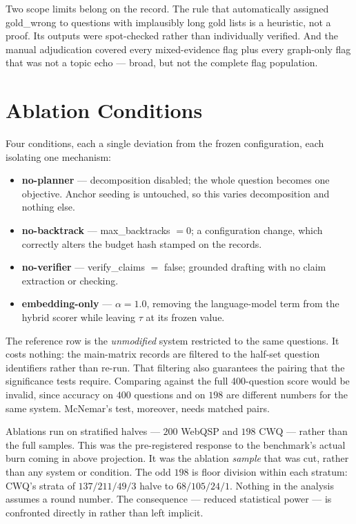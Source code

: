 Two scope limits belong on the record. The rule that automatically assigned
\textsf{gold\_wrong} to questions with implausibly long gold lists is a
heuristic, not a proof. Its outputs were spot-checked rather than
individually verified. And the manual adjudication covered every mixed-evidence
flag plus every graph-only flag that was not a topic echo --- broad, but not the
complete flag population.

\section{Ablation Conditions}\label{sec:ablation-conditions}

Four conditions, each a single deviation from the frozen configuration, each
isolating one mechanism:

\begin{itemize}
  \item \textbf{no-planner} --- decomposition disabled; the whole question
  becomes one objective. Anchor seeding is untouched, so this varies
  decomposition and nothing else.
  \item \textbf{no-backtrack} --- \textsf{max\_backtracks} $= 0$; a
  configuration change, which correctly alters the budget hash stamped on the
  records.
  \item \textbf{no-verifier} --- \textsf{verify\_claims} $=$ false; grounded
  drafting with no claim extraction or checking.
  \item \textbf{embedding-only} --- $\alpha = 1.0$, removing the language-model
  term from the hybrid scorer while leaving $\tau$ at its frozen value.
\end{itemize}

The reference row is the \emph{unmodified} system restricted to the same
questions. It costs nothing: the main-matrix records are filtered to the
half-set question identifiers rather than re-run. That filtering also
guarantees the pairing that the significance tests require. Comparing against
the full 400-question score would be invalid, since accuracy on $400$ questions
and on $198$ are different numbers for the same system. McNemar's test,
moreover, needs matched pairs.

Ablations run on stratified halves --- $200$ WebQSP and $198$ CWQ --- rather
than the full samples. This was the pre-registered response to the benchmark's
actual burn coming in above projection. It was the ablation \emph{sample}
that was cut, rather than any system or condition. The odd $198$ is floor
division within each stratum: CWQ's strata of $137/211/49/3$ halve to
$68/105/24/1$. Nothing in the analysis assumes a round number. The
consequence --- reduced statistical power --- is confronted directly in
 rather than left implicit.

